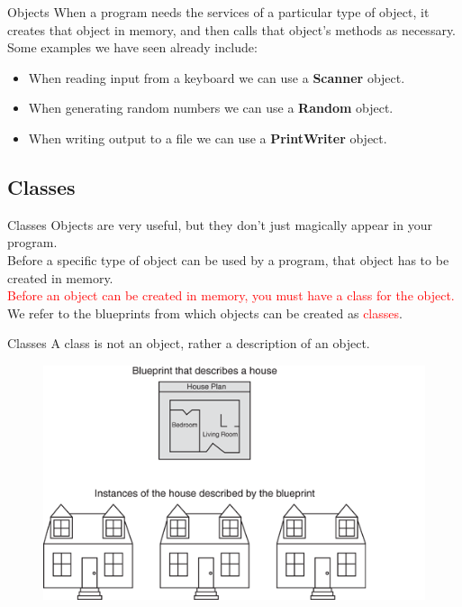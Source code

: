 \documentclass[11pt]{beamer}
\newcommand{\red}[1]{\textcolor{red}{#1}}
\begin{document}
\begin{frame}{Objects}
    When a program needs the services of a particular type of object, it creates that object in memory, and then calls that object’s methods as necessary. \\ 
    \vspace{1em}
    Some examples we have seen already include: \\
    \vspace{1em}
    \begin{itemize}
        \item When reading input from a keyboard we can use a \textbf{Scanner} object.
        \item When generating random numbers we can use a \textbf{Random} object.
        \item When writing output to a file we can use a \textbf{PrintWriter} object.
    \end{itemize}
\end{frame}

\subsection{Classes}
\begin{frame}{Classes}
    Objects are very useful, but they don’t just magically appear in your program. \\ 
    \vspace{1em}
    Before a specific type of object can be used by a program, that object has to be created in memory. \\
    \vspace{1em}
    \red{Before an object can be created in memory, you must have a class for the object.} \\ 
    \vspace{1em}
    We refer to the blueprints from which objects can be created as \red{classes}. \\ 
\end{frame}

\begin{frame}{Classes}
A class is not an object, rather a description of an object.
    \noindent 
    \begin{figure}[H]
    \centering
    \includegraphics[scale=0.8]{Images/chapter06_BlueprintHouses.png}
    \end{figure}
\end{frame}
\end{document}
